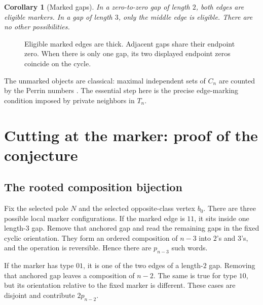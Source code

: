 \documentclass[11pt,letterpaper]{article}
\numberwithin{equation}{section}
\newtheorem{corollary}[theorem]{Corollary}
\theoremstyle{definition}
\newcommand{\1}{\mathbf 1}
\begin{document}
\begin{corollary}[Marked gaps]\label{cor:gaps}
In a zero-to-zero gap of length $2$, both edges are eligible markers.
In a gap of length $3$, only the middle edge is eligible.
There are no other possibilities.
\end{corollary}

\begin{figure}[ht]
\centering
{}
\caption{Eligible marked edges are thick. Adjacent gaps share their endpoint
zero. When there is only one gap, its two displayed endpoint zeros coincide
on the cycle.}
\label{fig:gaps}
\end{figure}
The unmarked objects are classical: maximal independent sets of $C_n$ are
counted by the Perrin numbers \cite{A001608}. The essential step here is the
precise edge-marking condition imposed by private neighbors in $T_n$.

\section{Cutting at the marker: proof of the conjecture}\label{sec:proofgf}

\subsection{The rooted composition bijection}
Fix the selected pole $N$ and the selected opposite-class vertex $b_0$.
There are three possible local marker configurations.
If the marked edge is $11$, it sits inside one length-$3$ gap. Remove that
anchored gap and read the remaining gaps in the fixed cyclic orientation.
They form an ordered composition of $n-3$ into $2$'s and $3$'s, and the operation
is reversible. Hence there are $p_{n-3}$ such words.

If the marker has type $01$, it is one of the two edges of a length-$2$ gap.
Removing that anchored gap leaves a composition of $n-2$. The same is true
for type $10$, but its orientation relative to the fixed marker is different.
These cases are disjoint and contribute $2p_{n-2}$.
\end{document}
